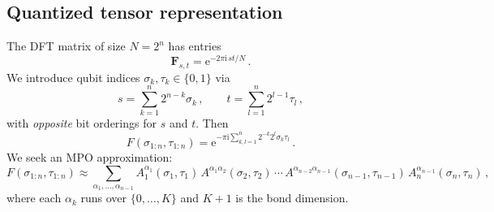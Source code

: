 \documentclass[11pt,a4paper]{article}
\theoremstyle{definition}
\theoremstyle{remark}
\newcommand{\ee}{\mathrm{e}}
\newcommand{\ii}{\mathrm{i}}
\begin{document}
\subsection{Quantized tensor representation}

The DFT matrix of size $N=2^n$ has entries
\begin{equation}\label{eq:DFT}
  \mathbf{F}_{s,t} = \ee^{-2\pi\ii\, st/N}\,.
\end{equation}
We introduce qubit indices $\sigma_k, \tau_k \in \{0,1\}$ via
\begin{equation}\label{eq:binary}
  s = \sum_{k=1}^n 2^{n-k}\sigma_k\,, \qquad
  t = \sum_{l=1}^n 2^{l-1}\tau_l\,,
\end{equation}
with \emph{opposite} bit orderings for $s$ and $t$. Then
\begin{equation}\label{eq:F_tensor}
  F(\sigma_{1:n},\tau_{1:n}) = \ee^{-\pi\ii \sum_{k,l=1}^n 2^{-k}2^l \sigma_k\tau_l}\,.
\end{equation}
We seek an MPO approximation:
\begin{equation}\label{eq:MPO_def}
  F(\sigma_{1:n},\tau_{1:n}) \approx \sum_{\alpha_1,\ldots,\alpha_{n-1}}
  A_1^{\alpha_1}(\sigma_1,\tau_1)\,
  A^{\alpha_1\alpha_2}(\sigma_2,\tau_2)\,\cdots\,
  A^{\alpha_{n-2}\alpha_{n-1}}(\sigma_{n-1},\tau_{n-1})\,
  A_n^{\alpha_{n-1}}(\sigma_n,\tau_n)\,,
\end{equation}
where each $\alpha_k$ runs over $\{0,\ldots,K\}$ and $K+1$ is the bond dimension.
\end{document}
